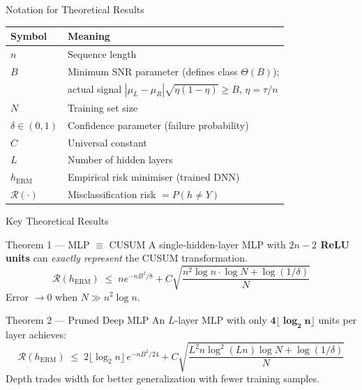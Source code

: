 \documentclass[8.5pt]{beamer}
\begin{document}
\begin{frame}{Notation for Theoretical Results}
  \begin{center}
  \begin{tabular}{@{}ll@{}}
    \toprule
    Symbol & Meaning \\
    \midrule
    $n$                    & Sequence length \\
    $B$                    & Minimum SNR parameter (defines class $\Theta(B)$); \\
                           & \quad actual signal $|\mu_L-\mu_R|\sqrt{\eta(1-\eta)} \ge B$,\; $\eta=\tau/n$ \\
    $N$                    & Training set size \\
    $\delta \in (0,1)$     & Confidence parameter (failure probability) \\
    $C$                    & Universal constant \\
    $L$                    & Number of hidden layers \\
    $h_{\text{ERM}}$       & Empirical risk minimiser (trained DNN) \\
    $\mathcal{R}(\cdot)$   & Misclassification risk $= P(h \neq Y)$ \\
    \bottomrule
  \end{tabular}
  \end{center}
\end{frame}

\begin{frame}{Key Theoretical Results \cite{li2024automatic}}
  \begin{block}{Theorem 1 — MLP $\equiv$ CUSUM}
    A single-hidden-layer MLP with \textbf{$2n-2$ ReLU units} can
    \emph{exactly represent} the CUSUM transformation.
    \[
      \mathcal{R}(h_{\text{ERM}}) \;\le\; n e^{-nB^2/8}
      + C\sqrt{\frac{n^2\log n\cdot\log N + \log(1/\delta)}{N}}
    \]
    Error $\to 0$ when $N \gg n^2\log n$.
  \end{block}

  \begin{block}{Theorem 2 — Pruned Deep MLP}
    An $L$-layer MLP with only $\mathbf{4\lfloor\log_2 n\rfloor}$ units per layer achieves:
    \[
      \mathcal{R}(h_{\text{ERM}}) \;\le\;
        2\lfloor\log_2 n\rfloor\, e^{-nB^2/24}
        + C\sqrt{\frac{L^2 n\log^2(Ln)\log N + \log(1/\delta)}{N}}
    \]
    Depth trades width for better generalization with fewer training samples.
  \end{block}
\end{frame}
\end{document}
